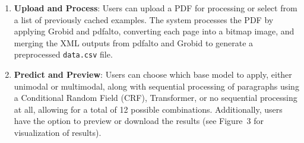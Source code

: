 \documentclass[runningheads]{llncs}
\begin{document}
\begin{enumerate}
    \item \textbf{Upload and Process}: Users can upload a PDF for processing or select from a list of previously 
    cached examples. The system processes the PDF by applying Grobid and pdfalto, converting each page into a bitmap image, 
    and merging the XML outputs from pdfalto and Grobid to generate a preprocessed \texttt{data.csv} file.

    \item \textbf{Predict and Preview}: Users can choose which base model to apply, either unimodal or multimodal, along with 
    sequential processing of paragraphs using a Conditional Random Field (CRF), Transformer, or no sequential processing at all, 
    allowing for a total of 12 possible combinations. Additionally, users have the option to preview or download the results 
    (see Figure~3 for visualization of results).


\end{enumerate}
\end{document}

